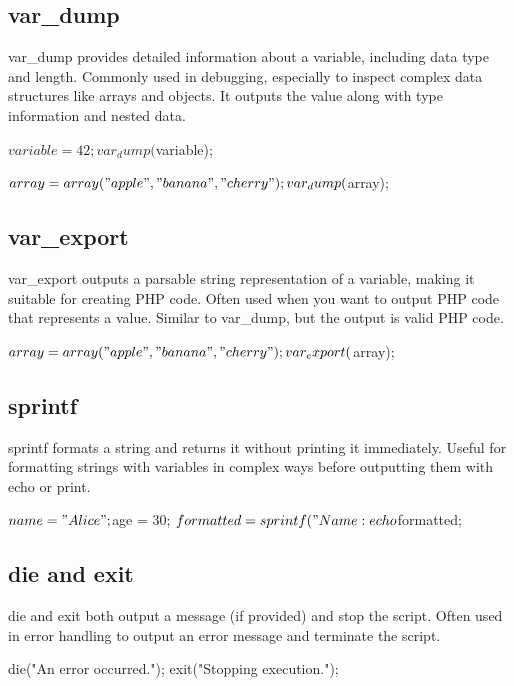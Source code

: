 \documentclass{report}
\begin{document}
    \bigbreak \noindent 
    \subsection{var\_dump}
    \bigbreak \noindent 
    var\_dump provides detailed information about a variable, including data type and length.
    \bigbreak \noindent 
    Commonly used in debugging, especially to inspect complex data structures like arrays and objects.
    \bigbreak \noindent 
    It outputs the value along with type information and nested data.
    \bigbreak \noindent 
    \begin{phpcode}
        $variable = 42;
        var_dump($variable);

        $array = array("apple", "banana", "cherry");
        var_dump($array);
    \end{phpcode}

    \bigbreak \noindent 
    \subsection{var\_export}
    \bigbreak \noindent 
    var\_export outputs a parsable string representation of a variable, making it suitable for creating PHP code.
    \bigbreak \noindent 
    Often used when you want to output PHP code that represents a value.
    \bigbreak \noindent 
    Similar to var\_dump, but the output is valid PHP code.
    \bigbreak \noindent 
    \begin{phpcode}
        $array = array("apple", "banana", "cherry");
        var_export($array);
    \end{phpcode}

    \bigbreak \noindent 
    \subsection{sprintf}
    \bigbreak \noindent 
    sprintf formats a string and returns it without printing it immediately.
    \bigbreak \noindent 
    Useful for formatting strings with variables in complex ways before outputting them with echo or print.
    \bigbreak \noindent 
    \begin{phpcode}
        $name = "Alice";
        $age = 30;
        $formatted = sprintf("Name: %
        echo $formatted;
    \end{phpcode}

    \bigbreak \noindent 
    \subsection{die and exit}
    \bigbreak \noindent 
    die and exit both output a message (if provided) and stop the script.
    \bigbreak \noindent 
    Often used in error handling to output an error message and terminate the script.
    \bigbreak \noindent 
    \begin{phpcode}
        die("An error occurred.");
        exit("Stopping execution.");
    \end{phpcode}
\end{document}
